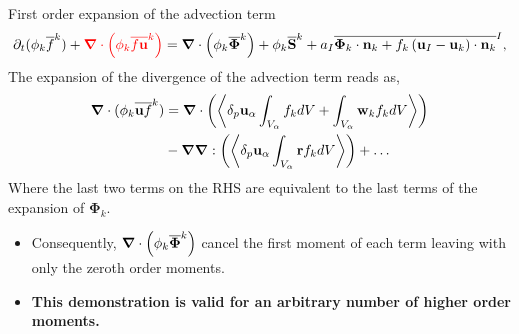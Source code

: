 \documentclass{sintefbeamer}
\newcommand{\nablab}{\bm{\nabla}}
\begin{document}
\begin{frame}
  {First order expansion of the advection term}
  \begin{equation*}
    \pddt (\phi_k\kavg{f})
    +\textcolor{red}{\nablab \cdot \left(
        \phi_k \kavg{f \textbf{u}}
    \right)}
    = \nablab \cdot \left(
        \phi_k \kavg{\bm{\Phi}}
    \right)
    + \phi_k \kavg{\textbf{S}}
    + a_I \Iavg{
        \bm{\Phi}_k \cdot \textbf{n}_k
        + f_k 
        \left(
            \textbf{u}_I
            - \textbf{u}_k
        \right) \cdot \textbf{n}_k
    },
    \label{eq:avg_k_global}
\end{equation*}
  The expansion of the divergence of the advection term reads as, 
  \begin{align*}
    \nablab \cdot (\phi_k \kavg{\textbf{u} f})
    &= 
    \nablab \cdot \left(\pavg{
      \textbf{u}_\alpha  \int_{V_\alpha} f_k dV
      + \int_{V_\alpha} \textbf{w}_k f_k dV} \right)\\
    &- 
    \nablab\nablab : 
      \left(\pavg{\textbf{u}_\alpha  \int_{V_\alpha} \textbf{r} f_k dV} \right) +\ldots
\end{align*}
Where the last two terms on the RHS are equivalent to the last terms of the expansion of $\bm{\Phi}_k$.
\begin{itemize}
  \item Consequently, $\nablab \cdot \left(
    \phi_k \kavg{\bm{\Phi}}
\right)$ cancel the first moment of each term leaving with only the zeroth order moments. 
\item \textbf{This demonstration is valid for an arbitrary number of higher order moments.}
\end{itemize}
\end{frame}
\end{document}
